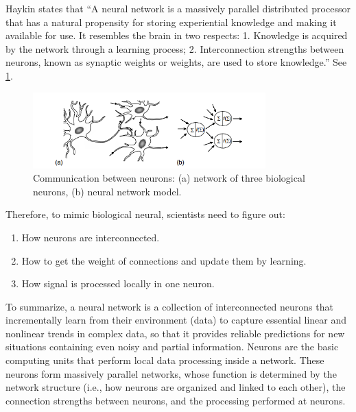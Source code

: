 \documentclass[a4paper]{book}
\begin{document}
  Haykin\cite{Haykin:1998:NNC:521706} states that “A neural network is
  a massively parallel distributed processor that has a natural
  propensity for storing experiential knowledge and making it
  available for use. It resembles the brain in two respects: 1.
  Knowledge is acquired by the network through a learning process; 2.
  Interconnection strengths between neurons, known as synaptic weights
  or weights, are used to store knowledge.” See
  \cref{fig:neural_network}.

  \begin{figure}[h]
    \begin{center}
      \includegraphics[width=0.8\textwidth]{./figures/neural_networks.PNG}
      \caption{Communication between neurons: (a) network of three biological
neurons, (b) neural network model.\label{fig:neural_network}}
    \end{center}
  \end{figure}

  Therefore, to mimic biological neural, scientists need to figure
  out:
  \begin{enumerate}
    \item How neurons are interconnected.
    \item How to get the weight of connections and update them by
      learning.
    \item How signal is processed locally in one neuron.
  \end{enumerate}

  To summarize, a neural network is a collection of interconnected
  neurons that incrementally learn from their environment (data) to
  capture essential linear and nonlinear trends in complex data, so
  that it provides reliable predictions for new situations containing
  even noisy and partial information.  Neurons are the basic computing
  units that perform local data processing inside a network. These
  neurons form massively parallel networks, whose function is
  determined by the network structure (i.e., how neurons are organized
  and linked to each other), the connection strengths between neurons,
  and the processing performed at neurons.
\end{document}
